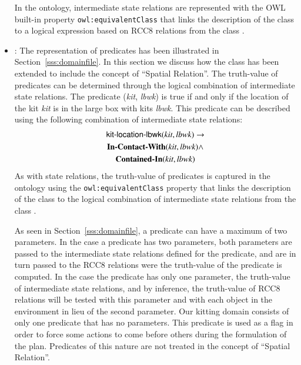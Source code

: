 \begin{itemize}
In the ontology, intermediate state relations are represented with the OWL built-in property
\texttt{owl:equivalentClass} that links the description of the class 
to a logical expression based on RCC8 relations from the class .
 \item {}: The representation of predicates has been illustrated in
Section~\ref{sss:domainfile}. In this section we discuss how the class 
has been extended to include the concept of ``Spatial Relation''. The truth-value of
predicates can be determined through the logical combination of intermediate state relations.
The predicate (\textit{kit}, \textit{lbwk}) is true if and only if the
location of the kit \textit{kit} is in the large box with kits \textit{lbwk}. This predicate can
be described using the following combination of intermediate state relations:
\begin{gather}
\textsf{kit-location-lbwk}(\textit{kit}, \textit{lbwk}) \rightarrow   \notag\\
\textbf{In-Contact-With}(\textit{kit}, \textit{lbwk}) \wedge \notag\\
\textbf{Contained-In}(\textit{kit}, \textit{lbwk}) \notag
\end{gather}
As with state relations, the truth-value of predicates is captured in the ontology using the
\texttt{owl:equivalentClass} property that links the description of the class 
to the logical combination of intermediate state relations from the class .

As seen in Section~\ref{sss:domainfile}, a predicate can have a maximum of two parameters.
In the case a predicate has two parameters, both parameters are passed to the intermediate
state relations defined for the predicate, and are in turn passed to the RCC8 relations were
the truth-value of the predicate is computed. In the case the predicate has only one parameter,
the truth-value of intermediate state relations, and by inference, the truth-value of RCC8
relations will be tested with this parameter and with each object in the environment in lieu
of the second parameter. Our kitting domain consists of only one predicate that has no parameters.
This predicate is used as a flag in order to force some actions to come before others during the
formulation of the plan. Predicates of this nature are not treated in the concept of ``Spatial Relation''.
\end{itemize}



